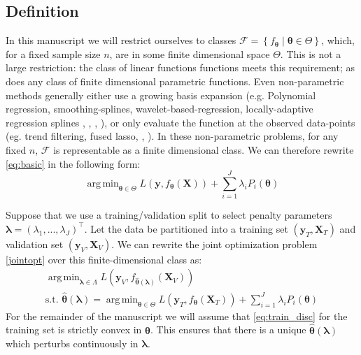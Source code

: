 \documentclass{statsoc}
\DeclareMathOperator*{\argmin}{arg\,min}
\begin{document}
\subsection{Definition}
In this manuscript we will restrict ourselves to classes $\mathcal{F} = \left\{f_{\boldsymbol \theta}\middle| \boldsymbol \theta\in\Theta\right\}$, which, for a fixed sample size $n$, are in some finite dimensional space $\Theta$. This is not a large restriction: the class of linear functions functions meets this requirement; as does any class of finite dimensional parametric functions. Even non-parametric methods generally either use a growing basis expansion (e.g. Polynomial regression, smoothing-splines, wavelet-based-regression, locally-adaptive regression splines \citep{tsybakov2008introduction}, \citep{wahba1981spline}, \citep{donoho1994ideal}, \citep{mammen1997locally}), or only evaluate the function at the observed data-points (eg. trend filtering, fused lasso, \citep{kim2009ell_1}, \citep{tibshirani2005sparsity}). In these non-parametric problems, for any fixed $n$, $\mathcal{F}$ is representable as a finite dimensional class.
We can therefore rewrite \eqref{eq:basic} in the following form:
\begin{equation}\label{eq:train_disc}
\argmin_{\boldsymbol \theta \in \Theta} L(\boldsymbol{y}, f_{\boldsymbol \theta}(\boldsymbol{X})) + \sum\limits_{i=1}^J \lambda_i P_i(\boldsymbol \theta)
\end{equation}

Suppose that we use a training/validation split to select penalty parameters $\boldsymbol{\lambda} = (\lambda_1, ..., \lambda_J)^\top$. Let the data be partitioned into a training set $(\boldsymbol{y}_T , \boldsymbol{X}_T)$ and validation set $(\boldsymbol{y}_V, \boldsymbol{X}_V)$. We can rewrite the joint optimization problem \eqref{jointopt} over this finite-dimensional class as:
\begin{equation}
\begin{array}{c}
\argmin_{\boldsymbol{\lambda} \in \Lambda} L(\boldsymbol{y}_V, f_{\hat{\boldsymbol \theta}(\boldsymbol{\lambda})}(\boldsymbol{X}_V)) \\
\text{s.t. } {\hat{\boldsymbol \theta}(\boldsymbol{\lambda})} = \argmin_{\boldsymbol \theta \in \Theta} L(\boldsymbol{y}_T, f_{\boldsymbol \theta} (\boldsymbol{X}_T)) + \sum\limits_{i=1}^J \lambda_i P_i(\boldsymbol \theta)
\end{array}
\label{jointopt2}
\end{equation}
For the remainder of the manuscript we will assume that \eqref{eq:train_disc} for the training set is strictly convex in $\boldsymbol \theta$. This ensures that there is a unique $\hat{\boldsymbol \theta}(\boldsymbol{\lambda})$ which perturbs continuously in $\boldsymbol{\lambda}$.
\end{document}

